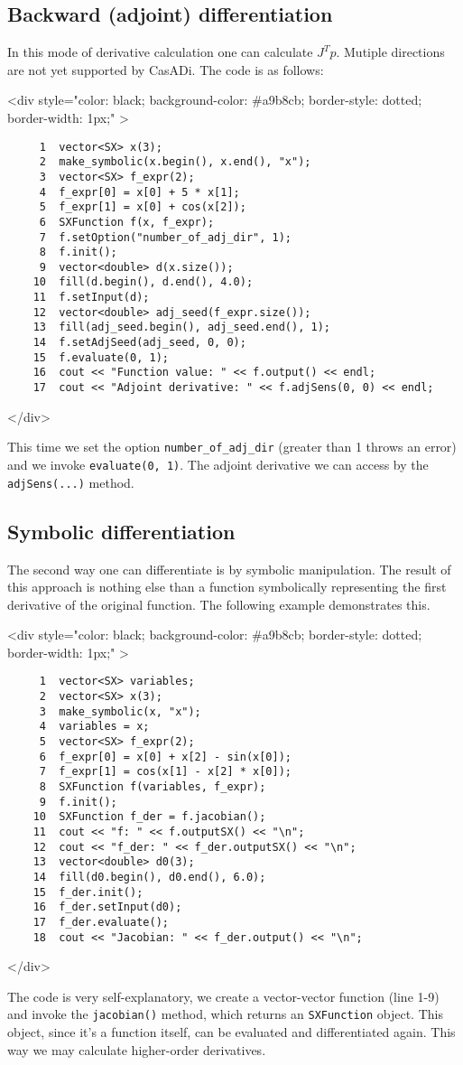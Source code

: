 \documentclass[a4paper,12pt]{book}
\newcommand{\codebegin}{
\begin{rawhtml}
<div style="color: black; background-color: \#a9b8cb;  border-style: dotted; border-width: 1px;" >
\end{rawhtml}
}
\newcommand{\codeend}{
\begin{rawhtml}
</div>
\end{rawhtml}
}
\newcommand{\codebegin}{

}
\newcommand{\codeend}{

}
\begin{document}
{\subsection*{Backward (adjoint) differentiation}
In this mode of derivative calculation one can calculate $J^T p$. Mutiple directions are not yet supported by CasADi.
The code is as follows:
\par
\codebegin
\begin{verbatim}
     1  vector<SX> x(3);
     2  make_symbolic(x.begin(), x.end(), "x");
     3  vector<SX> f_expr(2);
     4  f_expr[0] = x[0] + 5 * x[1];
     5  f_expr[1] = x[0] + cos(x[2]);
     6  SXFunction f(x, f_expr);
     7  f.setOption("number_of_adj_dir", 1);
     8  f.init();
     9  vector<double> d(x.size());
    10  fill(d.begin(), d.end(), 4.0);
    11  f.setInput(d);
    12  vector<double> adj_seed(f_expr.size());
    13  fill(adj_seed.begin(), adj_seed.end(), 1);
    14  f.setAdjSeed(adj_seed, 0, 0);
    15  f.evaluate(0, 1);
    16  cout << "Function value: " << f.output() << endl;
    17  cout << "Adjoint derivative: " << f.adjSens(0, 0) << endl;
\end{verbatim}
\codeend
This time we set the option \texttt{number\_of\_adj\_dir} (greater than 1 throws an error) and we invoke \texttt{evaluate(0, 1)}.
The adjoint derivative we can access by the \texttt{adjSens(...)} method.
\par
\subsection*{Symbolic differentiation}
The second way one can differentiate is by symbolic manipulation. The result of this approach is nothing else than a
function symbolically representing the first derivative of the original function. The following example demonstrates this.
\par
\codebegin
\begin{verbatim}
     1  vector<SX> variables;
     2  vector<SX> x(3);
     3  make_symbolic(x, "x");
     4  variables = x;
     5  vector<SX> f_expr(2);
     6  f_expr[0] = x[0] + x[2] - sin(x[0]);
     7  f_expr[1] = cos(x[1] - x[2] * x[0]);
     8  SXFunction f(variables, f_expr);
     9  f.init();
    10  SXFunction f_der = f.jacobian();
    11  cout << "f: " << f.outputSX() << "\n"; 
    12  cout << "f_der: " << f_der.outputSX() << "\n";
    13  vector<double> d0(3);
    14  fill(d0.begin(), d0.end(), 6.0);
    15  f_der.init();
    16  f_der.setInput(d0);
    17  f_der.evaluate();
    18  cout << "Jacobian: " << f_der.output() << "\n"; 
\end{verbatim}
\codeend
The code is very self-explanatory, we create a vector-vector function (line 1-9) and invoke the \texttt{jacobian()} method, which
returns an \texttt{SXFunction} object. This object, since it's a function itself, can be evaluated and differentiated again.
This way we may calculate higher-order derivatives.
}
\end{document}
